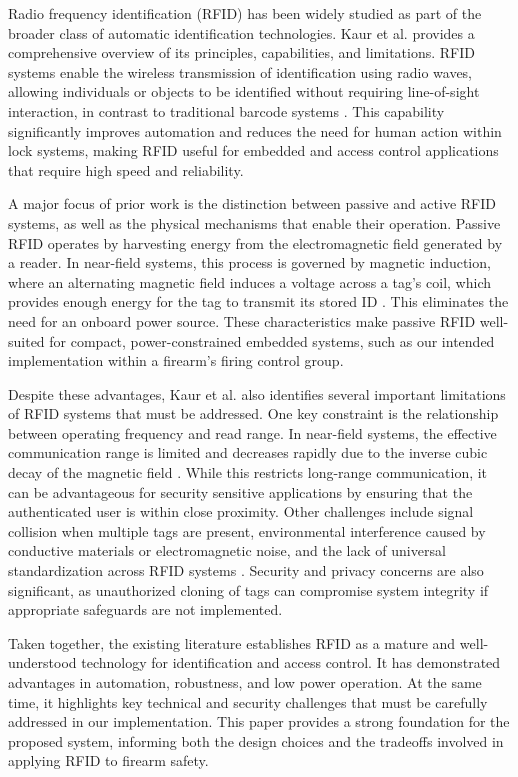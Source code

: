 Radio frequency identification (RFID) has been widely studied as part of the broader class of automatic identification technologies. Kaur et al. provides a comprehensive overview of its principles, capabilities, and limitations. RFID systems enable the wireless transmission of identification using radio waves, allowing individuals or objects to be identified without requiring line-of-sight interaction, in contrast to traditional barcode systems \cite{kaur2011rfid}. This capability significantly improves automation and reduces the need for human action within lock systems, making RFID useful for embedded and access control applications that require high speed and reliability. 

A major focus of prior work is the distinction between passive and active RFID systems, as well as the physical mechanisms that enable their operation. Passive RFID operates by harvesting energy from the electromagnetic field generated by a reader. In near-field systems, this process is governed by magnetic induction, where an alternating magnetic field induces a voltage across a tag's coil, which provides enough energy for the tag to transmit its stored ID \cite{kaur2011rfid}. This eliminates the need for an onboard power source. These characteristics make passive RFID well-suited for compact, power-constrained embedded systems, such as our intended implementation within a firearm's firing control group. 

Despite these advantages, Kaur et al. also identifies several important limitations of RFID systems that must be addressed. One key constraint is the relationship between operating frequency and read range. In near-field systems, the effective communication range is limited and decreases rapidly due to the inverse cubic decay of the magnetic field \cite{kaur2011rfid}. While this restricts long-range communication, it can be advantageous for security sensitive applications by ensuring that the authenticated user is within close proximity. Other challenges include signal collision when multiple tags are present, environmental interference caused by conductive materials or electromagnetic noise, and the lack of universal standardization across RFID systems \cite{kaur2011rfid}. Security and privacy concerns are also significant, as unauthorized cloning of tags can compromise system integrity if appropriate safeguards are not implemented.

Taken together, the existing literature establishes RFID as a mature and well-understood technology for identification and access control. It has demonstrated advantages in automation, robustness, and low power operation. At the same time, it highlights key technical and security challenges that must be carefully addressed in our implementation. This paper provides a strong foundation for the proposed system, informing both the design choices and the tradeoffs involved in applying RFID to firearm safety.
